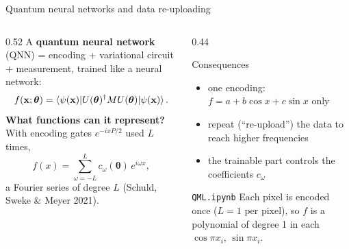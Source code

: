 \documentclass[aspectratio=169,11pt]{beamer}
\newcommand{\key}[1]{{\color{qdark}\textbf{#1}}}
\newcommand{\btheta}{\boldsymbol\theta}
\newcommand{\bx}{\mathbf x}
\begin{document}
\begin{frame}[label=fQNN]{Quantum neural networks and data re-uploading}
  \begin{columns}[T]
    \begin{column}{0.52\textwidth}
      \small
      A \key{quantum neural network} (QNN) = encoding + variational circuit + measurement, trained like a neural network:
      \[ f(\bx; \btheta) = \braket{\psi(\bx)|U(\btheta)^\dagger MU(\btheta)|\psi(\bx)}. \]
      \key{What functions can it represent?} With encoding gates $e^{-ixP/2}$ used $L$ times,
      \[ f(x) = \sum_{\omega=-L}^{L}c_\omega(\btheta)\,e^{i\omega x}, \]
      a Fourier series of degree $L$ (Schuld, Sweke \& Meyer 2021).
    \end{column}
    \begin{column}{0.44\textwidth}
      \begin{exampleblock}{Consequences}
        \scriptsize
        \begin{itemize}\itemsep1pt
          \item one encoding: $f = a + b\cos x + c\sin x$ only
          \item repeat (``re-upload'') the data to reach higher frequencies
          \item the trainable part controls the coefficients $c_\omega$
        \end{itemize}
      \end{exampleblock}
      \begin{block}{\texttt{QML.ipynb}}
        \scriptsize Each pixel is encoded once ($L = 1$ per pixel), so $f$ is a polynomial of degree 1 in each $\cos\pi x_i$, $\sin\pi x_i$.
      \end{block}
    \end{column}
  \end{columns}
\end{frame}
\end{document}
